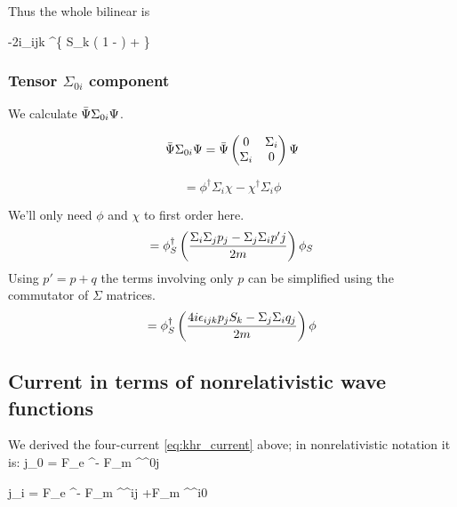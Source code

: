Thus the whole bilinear is

\beq
-2i\epsilon_{ijk} \phis^\dagger \left \{
				S_k \left( 1 -   \right )
				+  
			\right \} \phis
\eeq

\subsubsection{Tensor $\Sigma_{0i}$ component}

We calculate $\bar{\Psi} \Sigma_{0i} \Psi$.

\[
	\bar{\Psi} \Sigma_{0i} \Psi = \bar{\Psi} \begin{pmatrix} 0 & \Sigma_i \\ \Sigma_i & 0 \end{pmatrix} \Psi
\]

\[
	=	\phi^\dagger \Sigma_i \chi - \chi^\dagger \Sigma_i \phi
\]

We'll only need $\phi$ and $\chi$ to first order here.
\[
	= \phi_S^\dagger \left( \frac{\Sigma_i \Sigma_j p_j - \Sigma_j \Sigma_i p'j}{2m} \right ) \phi_S
\]
Using $p'=p+q$ the terms involving only $p$ can be simplified using the commutator of $\Sigma$ matrices.
\[
	=\phi_S^\dagger \left( \frac{ 4i\epsilon_{ijk} p_j S_k - \Sigma_j \Sigma_i q_j}{2m} \right )\phi
\]



\subsection{Current in terms of nonrelativistic wave functions}

We derived the four-current \eqref{eq:khr_current} above; in nonrelativistic notation it is: 
\beq
	j_0 =  F_e  \Psibar^\dagger \Psi -  F_m  \Psibar^\dagger \TensBi^{0j} \Psi
\eeq

\beq
	j_i =  F_e  \Psibar^\dagger \Psi -   F_m  \Psibar^\dagger \TensBi^{ij} \Psi 
			+F_m  \Psibar^\dagger \TensBi^{i0} \Psi
\eeq

